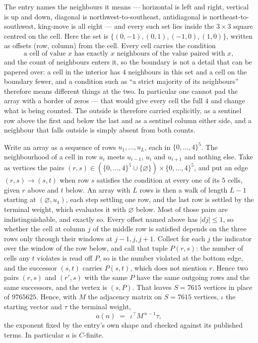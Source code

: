 \documentclass[11pt,a4paper]{article}
\theoremstyle{plain}
\theoremstyle{definition}
\begin{document}
The entry names the neighbours it means --- horizontal is left and right, vertical is up and
down, diagonal is northwest-to-southeast, antidiagonal is northeast-to-southwest, king-move is
all eight --- and every such set lies inside the $3\times3$ square centred on the cell. Here
the set is $\{(0,-1), (0,1), (-1,0), (1,0)\}$, written as offsets (row, column) from the cell. Every cell carries
the condition
\[
\text{a cell of value }x\text{ has exactly }x\text{ neighbours of the value paired with }x,
\]
and the count of neighbours enters it, so the boundary is not a detail that can be papered
over: a cell in the interior has $4$ neighbours in this set and a cell on the boundary
fewer, and a condition such as ``a strict majority of its neighbours'' therefore means
different things at the two. In particular one cannot pad the array with a border of zeros ---
that would give every cell the full $4$ and change what is being counted. The outside is
therefore carried
explicitly, as a sentinel row above the first and below the last and as a sentinel column
either side, and a neighbour that falls outside is simply absent from both counts.

Write an array as a sequence of rows $u_1,\dots,u_L$, each in
$\{0,\dots,4\}^{5}$. The neighbourhood of a cell in row $u_i$ meets $u_{i-1}$,
$u_i$ and $u_{i+1}$ and nothing else. Take as vertices the pairs
$(r,s)\in(\{0,\dots,4\}^{5}\cup\{\varnothing\})\times\{0,\dots,4\}^{5}$,
and put an edge $(r,s)\to(s,t)$ when row $s$ satisfies the condition at every one of its
$5$ cells, given $r$ above and $t$ below. An array with $L$ rows is then a walk of length
$L-1$ starting at $(\varnothing,u_1)$, each step settling one row, and the last row is
settled by the terminal weight, which evaluates it with $\varnothing$ below. Most of those pairs are indistinguishable, and exactly so. Every offset named above has $|dj|\le 1$, so whether the cell at column $j$ of the middle row is satisfied depends on the three rows only through their windows at $j-1,j,j+1$. Collect for each $j$ the indicator over the window of the row below, and call that tuple $P(r,s)$: the number of cells any $t$ violates is read off $P$, so is the number violated at the bottom edge, and the successor $(s,t)$ carries $P(s,t)$, which does not mention $r$. Hence two pairs $(r,s)$ and $(r',s)$ with the same $P$ have the same outgoing rows and the same successors, and the vertex is $(s,P)$. That leaves $S=7615$ vertices in place of $9765625$. Hence,
with $M$ the adjacency matrix on $S=7615$ vertices, $\iota$ the starting vector and $\tau$ the
terminal weight,
\[
a(n)\;=\;\,\iota^{\!\top}M^{\,n-1}\tau ,
\]
the exponent fixed by the entry's own shape and checked against its published terms. In
particular $a$ is $C$-finite.
\end{document}
